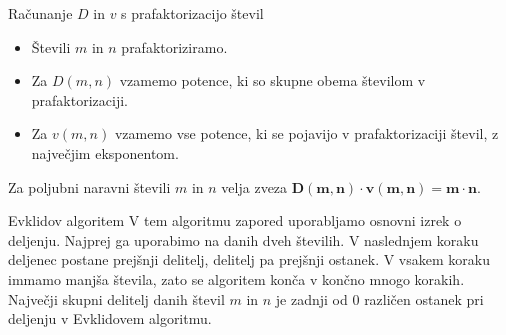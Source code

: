         \begin{frame}
            \begin{block}{Računanje $D$ in $v$ s prafaktorizacijo števil}
                \begin{itemize}
                    \item Števili $m$ in $n$ prafaktoriziramo.
                    \item Za $D(m,n)$ vzamemo potence, ki so skupne obema številom v prafaktorizaciji.
                    \item Za $v(m,n)$ vzamemo vse potence, ki se pojavijo v prafaktorizaciji števil, z največjim eksponentom.
                \end{itemize}                
            \end{block}

            \begin{block}{}
                Za poljubni naravni števili $m$ in $n$ velja zveza $\mathbf{D(m,n)\cdot v(m,n)=m\cdot n}$.
            \end{block}

            \begin{block}{Evklidov algoritem}
                V tem algoritmu zapored uporabljamo osnovni izrek o deljenju. Najprej ga uporabimo na danih dveh številih.
                V naslednjem koraku deljenec postane prejšnji delitelj, delitelj pa prejšnji ostanek. 
                V vsakem koraku immamo manjša števila, zato se algoritem konča v končno mnogo korakih.
                Največji skupni delitelj danih števil $m$ in $n$ je zadnji od $0$ različen ostanek pri deljenju v Evklidovem algoritmu.
            \end{block}
        \end{frame}

        \begin{frame}
        \end{frame}

